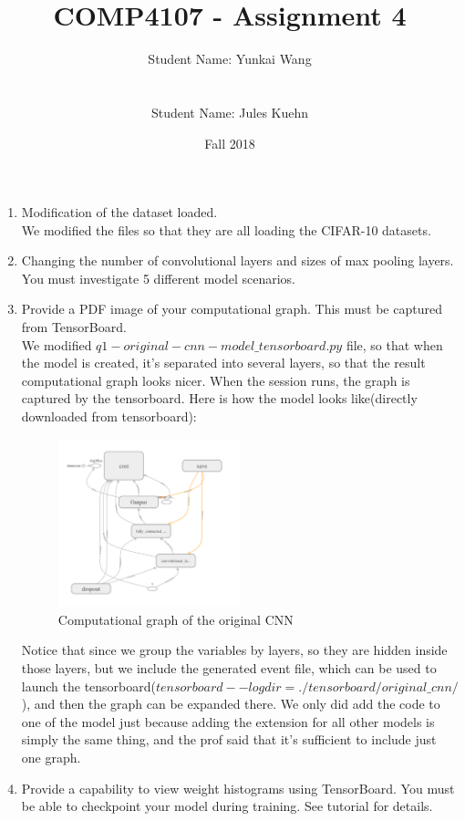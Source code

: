 \documentclass[11pt]{article}
\title{COMP4107 - Assignment 4}
\author{Student Name: Yunkai Wang\\
\text{Student Number: 100968473}\\\\
Student Name: Jules Kuehn\\
\text{Student Number: 100661464}}
\date{Fall 2018}
\begin{document}
\maketitle

\begin{enumerate}
\item Modification of the dataset loaded.\\
We modified the files so that they are all loading the CIFAR-10 datasets.
\item Changing the number of convolutional layers and sizes of max pooling layers. You must investigate 5 different model scenarios.\\
\item Provide a PDF image of your computational graph. This must be captured from TensorBoard.\\
We modified $q1-original-cnn-model\_tensorboard.py$ file, so that when the model is created, it's separated into several layers, so that the result computational graph looks nicer. When the session runs, the graph is captured by the tensorboard. Here is how the model looks like(directly downloaded from tensorboard):
\begin{figure}[h!]
    \centering
     \includegraphics[width=0.5\textwidth]{images/computational_graph}
        \caption{Computational graph of the original CNN}
\end{figure}
Notice that since we group the variables by layers, so they are hidden inside those layers, but we include the generated event file, which can be used to launch the tensorboard($tensorboard --logdir=./tensorboard/original\_cnn/$), and then the graph can be expanded there. We only did add the code to one of the model just because adding the extension for all other models is simply the same thing, and the prof said that it's sufficient to include just one graph.
\item Provide a capability to view weight histograms using TensorBoard. You must be able to checkpoint your model during training. See tutorial for details.\\

\end{enumerate}
\end{document}
